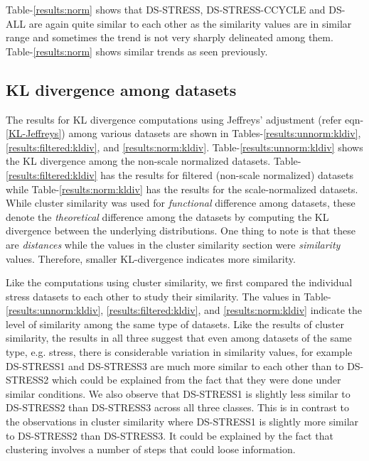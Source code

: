 Table-\ref{results:norm} shows that DS-STRESS, DS-STRESS-CCYCLE and DS-ALL are again quite similar to each other as the similarity values are in similar range and sometimes the trend is not very sharply delineated among them. Table-\ref{results:norm} shows similar trends as seen previously.

\subsection{KL divergence among datasets}


The results for KL divergence computations using Jeffreys' adjustment (refer eqn-\ref{KL-Jeffreys}) among various datasets are shown in Tables-\ref{results:unnorm:kldiv}, \ref{results:filtered:kldiv}, and \ref{results:norm:kldiv}. Table-\ref{results:unnorm:kldiv} shows the KL divergence among the non-scale normalized datasets. Table-\ref{results:filtered:kldiv} has the results for filtered (non-scale normalized) datasets while Table-\ref{results:norm:kldiv} has the results for the scale-normalized datasets. While cluster similarity was used for \textit{functional} difference among datasets, these denote the \textit{theoretical} difference among the datasets by computing the \ac{KL} divergence between the underlying distributions. One thing to note is that these are \textit{distances} while the values in the cluster similarity section were \textit{similarity} values. Therefore, smaller KL-divergence indicates more similarity. 

Like the computations using cluster similarity, we first compared the individual stress datasets to each other to study their similarity.  The values in Table-\ref{results:unnorm:kldiv}, \ref{results:filtered:kldiv}, and \ref{results:norm:kldiv} indicate the level of similarity among the same type of datasets. Like the results of cluster similarity, the results in all three suggest that even among datasets of the same type, e.g. stress, there is considerable variation in similarity values, for example DS-STRESS1 and DS-STRESS3 are much more similar to each other than to DS-STRESS2 which could be explained from the fact that they were done under similar conditions. We also observe that DS-STRESS1 is slightly less similar to DS-STRESS2 than DS-STRESS3 across all three classes. This is in contrast to the observations in cluster similarity where DS-STRESS1 is slightly more similar to DS-STRESS2 than DS-STRESS3. It could be explained by the fact that clustering involves a number of steps that could loose information.

